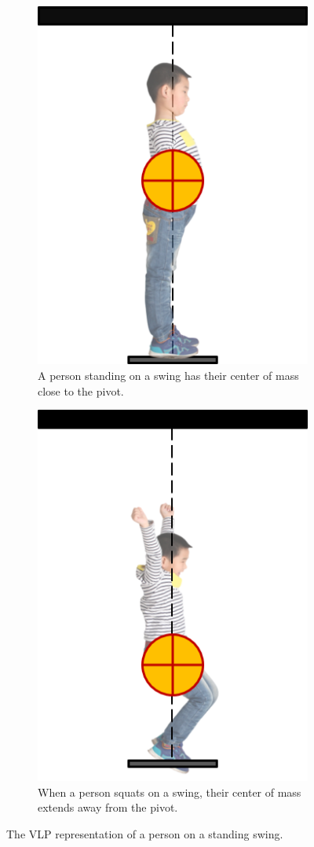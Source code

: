 \begin{figure}
   \centering
   \begin{subfigure}[t]{0.45\textwidth}
      \includegraphics[]{images/child_vlp_standing.png}
      \caption{A person standing on a swing has their center of mass 
      close to the pivot.}
   \end{subfigure}
   \hfill
   \begin{subfigure}[t]{0.45\textwidth}
      \includegraphics[]{images/child_vlp_squatting.png}
      \caption{When a person squats on a swing, their center of mass extends
      away from the pivot.}
   \end{subfigure}
   \caption{The VLP representation of a person on a standing swing.}
   \label{fig:child-vlp}
\end{figure}

